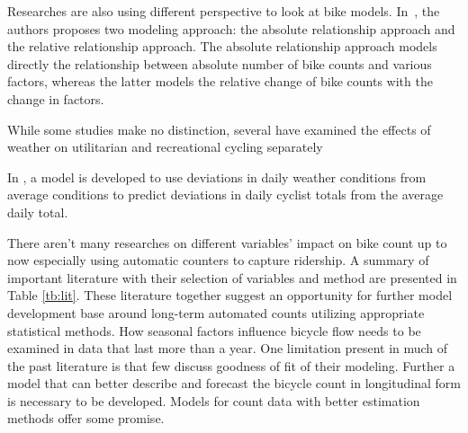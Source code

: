 \documentclass [11pt, proquest] {uwthesis}[2015/03/03]
\begin{document}
Researches are also using different perspective to look at bike models. In~\cite{}, the authors proposes two modeling approach: the absolute relationship approach and the relative relationship approach. The absolute relationship approach models directly the relationship between absolute number of bike counts and various factors, whereas the latter models the relative change of bike counts with the change in factors. 

While some studies make no distinction, several have examined the effects of weather on utilitarian and recreational cycling separately~\cite{Brandenburg07, Hanson77, Thomas12}

In \cite{Nosal14}, a model is developed to use deviations in daily weather conditions from average conditions to predict deviations in daily cyclist totals from the average daily total. 

There aren't many researches on different variables' impact on bike count up to now especially using automatic counters to capture ridership. A summary of important literature with their selection of variables and method are presented in Table \ref{tb:lit}. These literature together suggest an opportunity for further model development base around long-term automated counts utilizing appropriate statistical methods. How seasonal factors influence bicycle flow needs to be examined in data that last more than a year. One limitation present in much of the past literature is that few discuss goodness of fit of their modeling. Further a model that can better describe and forecast the bicycle count in longitudinal form is necessary to be developed. Models for count data with better estimation methods offer some promise. 
\end{document}
